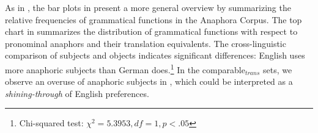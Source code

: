 \documentclass[output=paper]{LSP/langsci}
\begin{document}
\begin{table} 
\caption{Pronouns: Transpositions of the functions \textit{subject} and \textit{object}}\label{tab:func_pron}
\end{table}


As in , the bar plots in  present a more general overview by summarizing the relative frequencies of grammatical functions in the Anaphora Corpus. The top chart in  summarizes  the distribution of grammatical functions with respect to pronominal anaphors and their translation equivalents. The cross-linguistic comparison of subjects and objects indicates significant differences: English uses more anaphoric subjects than German does.\footnote{Chi-squared test: $\chi^2=5.3953, df=1, p<.05$} In the comparable$_{trans}$ sets, we observe an overuse of anaphoric subjects in \DEt, which could be interpreted as a \textit{shining-through} of English preferences. 
 
\end{document}
